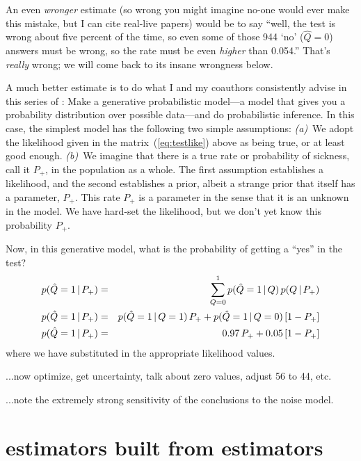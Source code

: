 \documentclass[12pt,twoside]{article}
\begin{document}
An even \emph{wronger} estimate (so wrong you might imagine no-one
would ever make this mistake, but I can cite real-live
papers) would be to say ``well, the test is wrong about
five percent of the time, so even some of those 944 `no' ($\hat{Q}=0$)
answers must be wrong, so the rate must be even \emph{higher} than
0.054.''  That's \emph{really} wrong; we will come back to its insane
wrongness below.

A much better estimate is to do what I and my coauthors consistently
advise in this series of \documentnames: Make a generative
probabilistic model---a model that gives you a probability
distribution over possible data---and do
probabilistic inference.  In this case, the simplest model has the
following two simple assumptions: \textsl{(a)}~We adopt the likelihood
given in the matrix~(\ref{eq:testlike}) above as being true, or at
least good enough.  \textsl{(b)}~We imagine that there is a true rate
or probability of sickness, call it $P_+$, in the population as a
whole.  The first assumption establishes a likelihood, and the second
establishes a prior, albeit a strange prior that itself has a
parameter, $P_+$. This rate $P_+$ is a parameter in the sense that it
is an unknown in the model.  We have hard-set the likelihood, but we
don't yet know this probability $P_+$.

Now, in this generative model, what is the probability of getting a
``yes'' in the test?
\begin{eqnarray}
p(\hat{Q}=1\,|\, P_+)
 &=& \sum_{Q=0}^1 p(\hat{Q}=1\,|\, Q)\,p(Q\,|\, P_+)
\\
p(\hat{Q}=1\,|\, P_+)
 &=& p(\hat{Q}=1\,|\, Q=1)\,P_+ + p(\hat{Q}=1\,|\, Q=0)\,[1 - P_+]
\\
p(\hat{Q}=1\,|\, P_+)
 &=& 0.97\,P_+ + 0.05\,[1 - P_+]
\end{eqnarray}
where we have substituted in the appropriate likelihood values.

...now optimize, get uncertainty, talk about zero values, adjust 56 to 44, etc.

...note the extremely strong sensitivity of the conclusions to the
noise model.

\section{estimators built from estimators}
\end{document}
